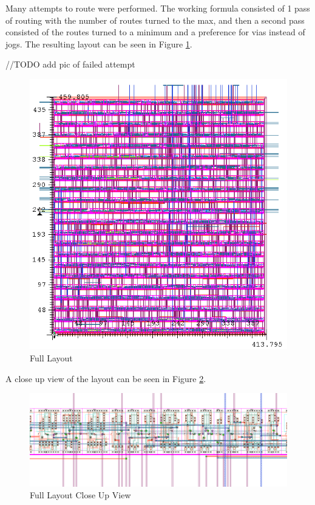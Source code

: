 \documentclass[11pt]{article}
\begin{document}
		Many attempts to route were performed. The working formula consisted of 1 pass of routing with the number of routes turned to the max, and then a second pass consisted of the routes turned to a minimum and a preference for vias instead of jogs. The resulting layout can be seen in Figure \ref{fig:Full-Layout}.
		
		//TODO add pic of failed attempt
		
		\begin{figure}[H] 
			\centering 
			\includegraphics[width=\textwidth,height=\dimexpr\textheight-4\baselineskip-\abovecaptionskip-\belowcaptionskip\relax,keepaspectratio]{"Pictures/Full Layout"}
			\caption{Full Layout} 
			\label{fig:Full-Layout} 
		\end{figure}
	
		A close up view of the layout can be seen in Figure \ref{fig:Full-Layout-Close-Up-View}.
	
		\begin{figure}[H] 
			\centering 
			\includegraphics[width=\textwidth,height=\dimexpr\textheight-4\baselineskip-\abovecaptionskip-\belowcaptionskip\relax,keepaspectratio]{"Pictures/Full Layout Close Up View"}
			\caption{Full Layout Close Up View} 
			\label{fig:Full-Layout-Close-Up-View} 
		\end{figure}
	
\end{document}
